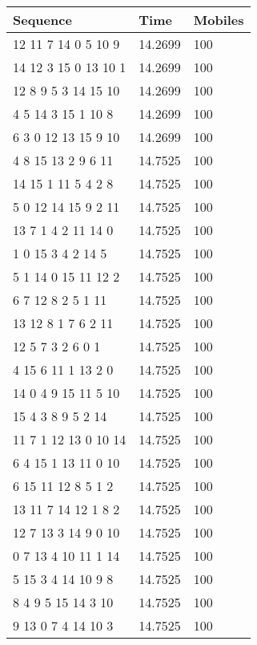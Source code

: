	\begin{table}[H]
		\centering
		\begin{tabular}{|l|l|l|}
		\hline
		Sequence             & Time    & Mobiles \\ \hline
		12 11 7 14 0 5 10 9  & 14.2699 & 100     \\ \hline
		14 12 3 15 0 13 10 1 & 14.2699 & 100     \\ \hline
		12 8 9 5 3 14 15 10  & 14.2699 & 100     \\ \hline
		4 5 14 3 15 1 10 8   & 14.2699 & 100     \\ \hline
		6 3 0 12 13 15 9 10  & 14.2699 & 100     \\ \hline
		4 8 15 13 2 9 6 11   & 14.7525 & 100     \\ \hline
		14 15 1 11 5 4 2 8   & 14.7525 & 100     \\ \hline
		5 0 12 14 15 9 2 11  & 14.7525 & 100     \\ \hline
		13 7 1 4 2 11 14 0   & 14.7525 & 100     \\ \hline
		1 0 15 3 4 2 14 5    & 14.7525 & 100     \\ \hline
		5 1 14 0 15 11 12 2  & 14.7525 & 100     \\ \hline
		6 7 12 8 2 5 1 11    & 14.7525 & 100     \\ \hline
		13 12 8 1 7 6 2 11   & 14.7525 & 100     \\ \hline
		12 5 7 3 2 6 0 1     & 14.7525 & 100     \\ \hline
		4 15 6 11 1 13 2 0   & 14.7525 & 100     \\ \hline
		14 0 4 9 15 11 5 10  & 14.7525 & 100     \\ \hline
		15 4 3 8 9 5 2 14    & 14.7525 & 100     \\ \hline
		11 7 1 12 13 0 10 14 & 14.7525 & 100     \\ \hline
		6 4 15 1 13 11 0 10  & 14.7525 & 100     \\ \hline
		6 15 11 12 8 5 1 2   & 14.7525 & 100     \\ \hline
		13 11 7 14 12 1 8 2  & 14.7525 & 100     \\ \hline
		12 7 13 3 14 9 0 10  & 14.7525 & 100     \\ \hline
		0 7 13 4 10 11 1 14  & 14.7525 & 100     \\ \hline
		5 15 3 4 14 10 9 8   & 14.7525 & 100     \\ \hline
		8 4 9 5 15 14 3 10   & 14.7525 & 100     \\ \hline
		9 13 0 7 4 14 10 3   & 14.7525 & 100     \\ \hline

\end{tabular}
\end{table}

